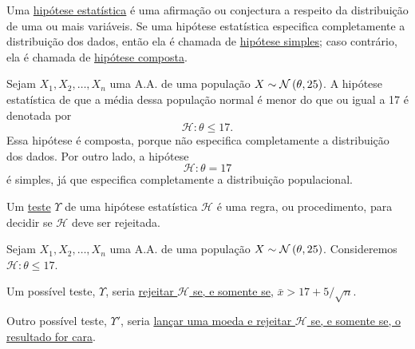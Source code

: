 
\begin{definition}
Uma \uline{hipótese estatística} é uma afirmação ou conjectura a respeito da distribuição de uma ou mais variáveis. Se uma hipótese estatística especifica completamente a distribuição dos dados, então ela é chamada de \uline{hipótese simples}; caso contrário, ela é chamada de \uline{hipótese composta}.
\end{definition}

\begin{example}
Sejam $X_1,X_2,\ldots,X_n$ uma A.A. de uma população $X\sim\normdist{\theta,25}$. A hipótese estatística de que a média dessa população normal é menor do que ou igual a 17 é denotada por
\begin{equation}
\mathcal{H}:\theta\leq17.
\end{equation}
Essa hipótese é composta, porque não especifica completamente a distribuição dos dados. Por outro lado, a hipótese
\begin{equation}
\mathcal{H}:\theta=17
\end{equation}
é simples, já que especifica completamente a distribuição populacional.
\end{example}

\begin{definition}
Um \uline{teste} $\Upsilon$ de uma hipótese estatística $\mathcal{H}$ é uma regra, ou procedimento, para decidir se $\mathcal{H}$ deve ser rejeitada.
\end{definition}

\begin{example}
Sejam $X_1,X_2,\ldots,X_n$ uma A.A. de uma população $X\sim\normdist{\theta,25}$. Consideremos $\mathcal{H}:\theta\leq17$.

Um possível teste, $\Upsilon$, seria \uline{rejeitar $\mathcal{H}$ se, e somente se,} $\bar{x}>17+5/\sqrt{n}$.

Outro possível teste, $\Upsilon'$, seria \uline{lançar uma moeda e rejeitar $\mathcal{H}$ se, e somente se, o resultado for cara}.
\end{example}

